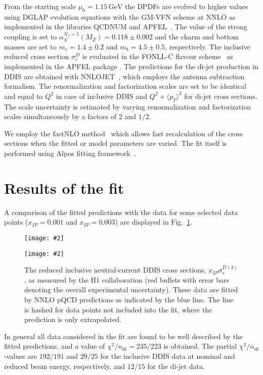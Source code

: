 \documentclass{PoS}
\newcommand{\IP}{I\!\!P}
\newcommand{\GeV}{\ensuremath{\mathrm{GeV}}\xspace}
\newcommand{\includegraphicss}[2][]{\texttt{[image: \#2]}}
\begin{document}
From the starting scale $\mu_0 = 1.15\,\GeV$ the DPDFs are evolved to higher values using DGLAP evolution equations with the GM-VFN scheme at NNLO as implemented in the libraries QCDNUM and APFEL~\cite{Botje:2010ay,Bertone:2013vaa}.
The value of the strong coupling is set to $\alpha_S^{N_f = 5} (M_Z) = 0.118\pm 0.002$ and the charm and bottom masses are set to $m_c = 1.4\pm 0.2$ and $m_b = 4.5\pm 0.5$, respectively.
The inclusive reduced cross section $\sigma_r^D$ is evaluated in the \mbox{FONLL-C} flavour scheme~\cite{Cacciari:1998it} as implemented in the APFEL package \cite{Bertone:2013vaa}.
The predictions for the di-jet production in DDIS are obtained with NNLOJET~\cite{Currie:2016ytq}, which employs the antenna subtraction formalism.
The renormalization and factorization scales are set to be identical and equal to $Q^2$ in case of inclusive DDIS and $Q^2 + \langle p_T\rangle^2$ for di-jet cross sections.
The scale uncertainty is estimated by varying renormalization and factorization scales simultaneously by a factors of 2 and $1/2$.

We employ the fastNLO method~\cite{Britzger:2012bs} which allows fast recalculation of the cross sections when the fitted or model parameters are varied.
The fit itself is performed using Alpos fitting framework~\cite{alpos}.


\section{Results of the fit}

A comparison of the fitted predictions with the data for some selected data points ($x_{\IP} = 0.001$ and $x_{\IP} = 0.003$) are displayed in Fig.~\ref{figDDISfit}.
\begin{figure}[tbhp]
\centering
\begin{minipage}[t]{0.47\textwidth}
\includegraphicss[trim={0cm 0.0cm 0 0.0cm},clip,width=.9\textwidth]{{{plots/H1prelim-19-013.fig11}}}
\end{minipage}
\begin{minipage}[t]{0.47\textwidth}
\includegraphicss[trim={0cm 1.2cm 0 1.1cm},clip,width=.9\textwidth]{{{plots/H1prelim-19-013.fig10}}}
\end{minipage}
\caption{The reduced inclusive neutral-current DDIS cross sections, $x_{\IP}\sigma_r^{D(3)}$, as measured by the H1 collaboration (red bullets with error bars denoting the overall experimental uncertainty). These data are fitted by NNLO pQCD predictions as indicated by the blue line. The line is hashed for data points not included into the fit, where the prediction is only extrapolated.}
\label{figDDISfit}
\end{figure}
In general all data considered in the fit are found to be well described by the fitted predictions, and
a value of $\chi^2/n_\mathrm{df} = 235/223$ is obtained.
The partial $\chi^2/n_\mathrm{df}$-values are $192/191$  and $29/25$ for the inclusive DDIS data at nominal and reduced beam energy, respectively, and $12/15$ for the di-jet data.
\end{document}
